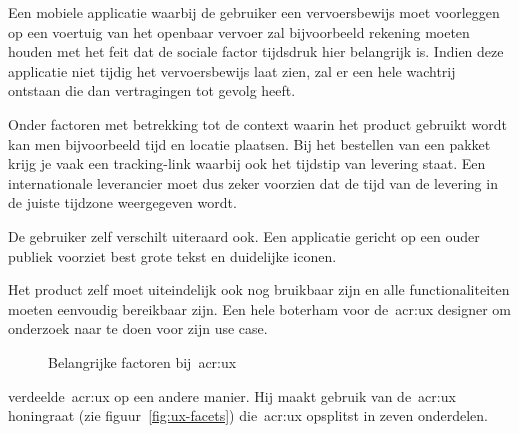 Een mobiele applicatie waarbij de gebruiker een vervoersbewijs moet voorleggen op een voertuig van het openbaar vervoer zal bijvoorbeeld rekening moeten houden met het feit dat de sociale factor tijdsdruk hier belangrijk is. Indien deze applicatie niet tijdig het vervoersbewijs laat zien, zal er een hele wachtrij ontstaan die dan vertragingen tot gevolg heeft.

Onder factoren met betrekking tot de context waarin het product gebruikt wordt kan men bijvoorbeeld tijd en locatie plaatsen. Bij het bestellen van een pakket krijg je vaak een tracking-link waarbij ook het tijdstip van levering staat. Een internationale leverancier moet dus zeker voorzien dat de tijd van de levering in de juiste tijdzone weergegeven wordt.

De gebruiker zelf verschilt uiteraard ook. Een applicatie gericht op een ouder publiek voorziet best grote tekst en duidelijke iconen.

Het product zelf moet uiteindelijk ook nog bruikbaar zijn en alle functionaliteiten moeten eenvoudig bereikbaar zijn.
Een hele boterham voor de~\acrlong{acr:ux} designer om onderzoek naar te doen voor zijn use case.

\begin{figure}
    \centering
    \def\svgwidth{.8\columnwidth}
    
    \caption{Belangrijke factoren bij~\acrlong{acr:ux}}
    \label{fig:ux-factoren}
\end{figure}

\textcite{Morville2004} verdeelde~\acrlong{acr:ux} op een andere manier. Hij maakt gebruik van de~\acrlong{acr:ux} honingraat (zie figuur~\ref{fig:ux-facets}) die~\acrlong{acr:ux} opsplitst in zeven onderdelen.

